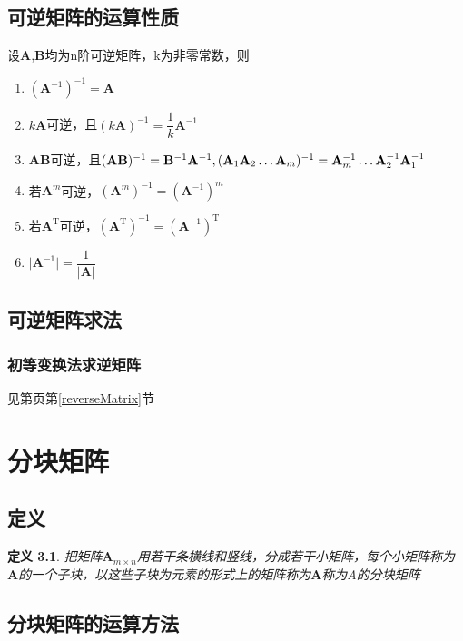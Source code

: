 \documentclass[12pt,oneside]{ctexbook}
\newtheorem{definition}[subsection]{定义}
\begin{document}
\section{可逆矩阵的运算性质}
设\(\mathbf{A}\),\(\mathbf{B}\)均为n阶可逆矩阵，k为非零常数，则
\begin{enumerate}
    \item \((\mathbf{A}^{-1})^{-1}=\mathbf{A}\)
    \item \(k\mathbf{A}\)可逆，且\((k\mathbf{A})^{-1}=\dfrac{1}{k}\mathbf{A}^{-1}\)
    \item \(\mathbf{A}\mathbf{B}\)可逆，且\((\mathbf{A}\mathbf{B})^{-1}=\mathbf{B}^{-1}\mathbf{A}^{-1},\\(\mathbf{A}_{1}\mathbf{A}_2\dots \mathbf{A}_m)^{-1}=\mathbf{A}_{m}^{-1}\dots \mathbf{A}_{2}^{-1}\mathbf{A}_{1}^{-1}\)
    \item 若\(\mathbf{A}^m\)可逆，\((\mathbf{A}^{m})^{-1}=(\mathbf{A}^{-1})^{m}\)
    \item 若\(\mathbf{A}^\mathrm{T}\)可逆，\((\mathbf{A}^\mathrm{T})^{-1}=(\mathbf{A}^{-1})^\mathrm{T}\)
    \item \(\rvert \mathbf{A}^{-1}\rvert=\dfrac{1}{\rvert \mathbf{A} \rvert}\)
\end{enumerate}

\section{可逆矩阵求法}
\subsection{初等变换法求逆矩阵}
见第\pageref{reverseMatrix}页第\ref{reverseMatrix}节

\chapter{分块矩阵}
\section{定义}
\begin{definition}
    把矩阵\(\mathbf{A}_{m \times n}\)用若干条横线和竖线，分成若干小矩阵，每个小矩阵称为\(\mathbf{A}\)的一个子块，以这些子块为元素的形式上的矩阵称为\(\mathbf{A}\)称为A的分块矩阵
\end{definition}
\section{分块矩阵的运算方法}
\end{document}
